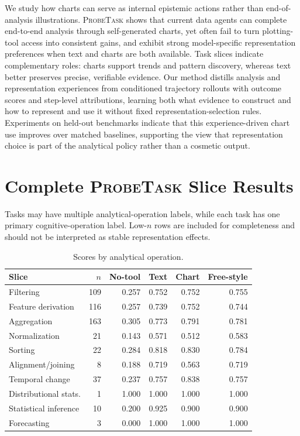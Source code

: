 \documentclass{article}
\newcommand{\probe}{\textsc{ProbeTask}}
\begin{document}
We study how charts can serve as internal epistemic actions rather than end-of-analysis illustrations.
\probe{} shows that current data agents can complete end-to-end analysis through self-generated charts, yet often fail to turn plotting-tool access into consistent gains, and exhibit strong model-specific representation preferences when text and charts are both available.
Task slices indicate complementary roles: charts support trends and pattern discovery, whereas text better preserves precise, verifiable evidence.
Our method distills analysis and representation experiences from conditioned trajectory rollouts with outcome scores and step-level attributions, learning both what evidence to construct and how to represent and use it without fixed representation-selection rules.
Experiments on held-out benchmarks indicate that this experience-driven chart use improves over matched baselines, supporting the view that representation choice is part of the analytical policy rather than a cosmetic output.





\appendix

\section{Complete \probe{} Slice Results}
\label{app:slices}

Tasks may have multiple analytical-operation labels, while each task has one primary cognitive-operation label.
Low-$n$ rows are included for completeness and should not be interpreted as stable representation effects.

\begin{table}[h]
  \caption{Scores by analytical operation.}
  \label{tab:operation-slices}
  \centering
  \scriptsize
  \setlength{\tabcolsep}{3.5pt}
  \begin{tabular}{lrrrrr}
    \toprule
    Slice & $n$ & No-tool & Text & Chart & Free-style \\
    \midrule
    Filtering             & 109 & 0.257 & 0.752 & 0.752 & 0.755 \\
    Feature derivation    & 116 & 0.257 & 0.739 & 0.752 & 0.744 \\
    Aggregation           & 163 & 0.305 & 0.773 & 0.791 & 0.781 \\
    Normalization         &  21 & 0.143 & 0.571 & 0.512 & 0.583 \\
    Sorting               &  22 & 0.284 & 0.818 & 0.830 & 0.784 \\
    Alignment/joining     &   8 & 0.188 & 0.719 & 0.563 & 0.719 \\
    Temporal change       &  37 & 0.237 & 0.757 & 0.838 & 0.757 \\
    Distributional stats. &   1 & 1.000 & 1.000 & 1.000 & 1.000 \\
    Statistical inference &  10 & 0.200 & 0.925 & 0.900 & 0.900 \\
    Forecasting           &   3 & 0.000 & 1.000 & 1.000 & 1.000 \\
    \bottomrule
  \end{tabular}
\end{table}
\end{document}
